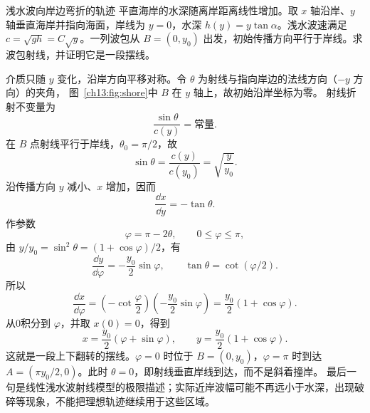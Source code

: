 \begin{origexamplebox}{浅水波向岸边弯折的轨迹}\label{ch13:ex:shore}
平直海岸的水深随离岸距离线性增加。取 $x$ 轴沿岸、$y$ 轴垂直海岸并指向海面，岸线为 $y=0$，水深
$h(y)=y\tan\alpha$。浅水波速满足 $c=\sqrt{gh}=C\sqrt y$。一列波包从
$B=(0,y_0)$ 出发，初始传播方向平行于岸线。求波包射线，并证明它是一段摆线。

\FluidShoreDiagram
\end{origexamplebox}
\begin{xesolution}
\ThAShore

介质只随 $y$ 变化，沿岸方向平移对称。令 $\theta$ 为射线与指向岸边的法线方向（$-y$ 方向）的夹角，
图~\ref{ch13:fig:shore}中 $B$ 在 $y$ 轴上，故初始沿岸坐标为零。
射线折射不变量为
\[
 \frac{\sin\theta}{c(y)}=\text{常量}.
\]
在 $B$ 点射线平行于岸线，$\theta_0=\pi/2$，故
\[
 \sin\theta=\frac{c(y)}{c(y_0)}=\sqrt{\frac y{y_0}}.
\]
沿传播方向 $y$ 减小、$x$ 增加，因而
\[
 \frac{\dd x}{\dd y}=-\tan\theta.
\]
作参数
\[
 \varphi=\pi-2\theta,\qquad 0\le\varphi\le\pi,
\]
由 $y/y_0=\sin^2\theta=(1+\cos\varphi)/2$，有
\[
 \frac{\dd y}{\dd\varphi}=-\frac{y_0}{2}\sin\varphi,
 \qquad \tan\theta=\cot(\varphi/2).
\]
所以
\[
 \frac{\dd x}{\dd\varphi}
 =\left(-\cot\frac\varphi2\right)\left(-\frac{y_0}2\sin\varphi\right)
 =\frac{y_0}2(1+\cos\varphi).
\]
从0积分到 $\varphi$，并取 $x(0)=0$，得到
\[
 \boxed{x=\frac{y_0}{2}(\varphi+\sin\varphi)},\qquad
 \boxed{y=\frac{y_0}{2}(1+\cos\varphi)}.
\]
这就是一段上下翻转的摆线。$\varphi=0$ 时位于 $B=(0,y_0)$，$\varphi=\pi$ 时到达
$A=(\pi y_0/2,0)$。此时 $\theta=0$，即射线垂直岸线到达，而不是斜着撞岸。
最后一句是线性浅水波射线模型的极限描述；实际近岸波幅可能不再远小于水深，出现破碎等现象，不能把理想轨迹继续用于这些区域。
\end{xesolution}

